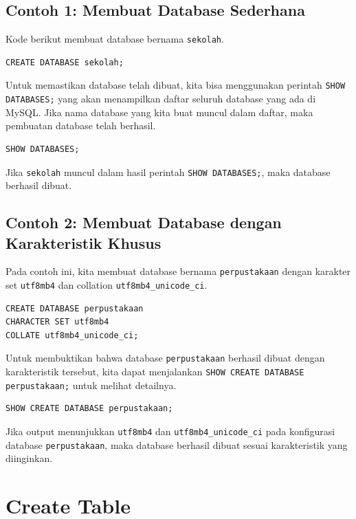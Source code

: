 \subsection*{Contoh 1: Membuat Database Sederhana}
Kode berikut membuat database bernama \texttt{sekolah}.

\begin{lstlisting}[style=sql]
CREATE DATABASE sekolah;
\end{lstlisting}

Untuk memastikan database telah dibuat, kita bisa menggunakan perintah \texttt{SHOW DATABASES;} yang akan menampilkan daftar seluruh database yang ada di MySQL. Jika nama database yang kita buat muncul dalam daftar, maka pembuatan database telah berhasil.

\begin{lstlisting}[style=sql]
SHOW DATABASES;
\end{lstlisting}

Jika \texttt{sekolah} muncul dalam hasil perintah \texttt{SHOW DATABASES;}, maka database berhasil dibuat.

\subsection*{Contoh 2: Membuat Database dengan Karakteristik Khusus}
Pada contoh ini, kita membuat database bernama \texttt{perpustakaan} dengan karakter set \texttt{utf8mb4} dan collation \texttt{utf8mb4\_unicode\_ci}.

\begin{lstlisting}[style=sql]
CREATE DATABASE perpustakaan
CHARACTER SET utf8mb4
COLLATE utf8mb4_unicode_ci;
\end{lstlisting}

Untuk membuktikan bahwa database \texttt{perpustakaan} berhasil dibuat dengan karakteristik tersebut, kita dapat menjalankan \texttt{SHOW CREATE DATABASE perpustakaan;} untuk melihat detailnya.

\begin{lstlisting}[style=sql]
SHOW CREATE DATABASE perpustakaan;
\end{lstlisting}

Jika output menunjukkan \texttt{utf8mb4} dan \texttt{utf8mb4\_unicode\_ci} pada konfigurasi database \texttt{perpustakaan}, maka database berhasil dibuat sesuai karakteristik yang diinginkan.

\section{Create Table}


